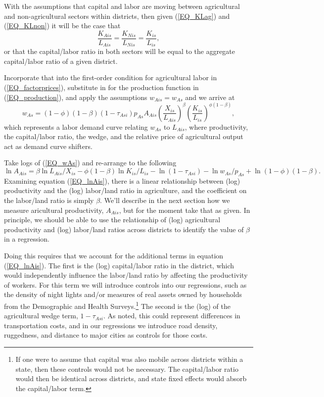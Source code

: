 \documentclass[11pt]{article}
\begin{document}
With the assumptions that capital and labor are moving between agricultural and non-agricultural sectors within districts, then given (\ref{EQ_KLag}) and (\ref{EQ_KLnon}) it will be the case that
\begin{equation*}
	\frac{K_{Ais}}{L_{Ais}} = \frac{K_{Nis}}{L_{Nis}} = \frac{K_{is}}{L_{is}},
\end{equation*}
or that the capital/labor ratio in both sectors will be equal to the aggregate capital/labor ratio of a given district.

Incorporate that into the first-order condition for agricultural labor in (\ref{EQ_factorprices}), substitute in for the production function in (\ref{EQ_production}), and apply the assumptions $w_{Ais} = w_{As}$ and we arrive at
\begin{equation}
	w_{As} = (1-\phi)(1-\beta) (1-\tau_{Asi}) p_{As} A_{Ais} \left(\frac{X_{is}}{L_{Ais}}\right)^{\beta} \left(\frac{K_{is}}{L_{is}}\right)^{\phi(1-\beta)}, \label{EQ_wAs}
\end{equation}
which represents a labor demand curve relating $w_{As}$ to $L_{Ais}$, where productivity, the capital/labor ratio, the wedge, and the relative price of agricultural output act as demand curve shifters. 

Take logs of (\ref{EQ_wAs}) and re-arrange to the following
\begin{equation}
	\ln A_{Ais} = \beta \ln L_{Ais}/X_{is} - \phi(1-\beta) \ln K_{is}/L_{is} - \ln (1-\tau_{Asi}) - \ln w_{As}/p_{As} + \ln (1-\phi)(1-\beta). \label{EQ_lnAis}
\end{equation}
Examining equation (\ref{EQ_lnAis}), there is a linear relationship between (log) productivity and the (log) labor/land ratio in agriculture, and the coefficient on the labor/land ratio is simply $\beta$. We'll describe in the next section how we measure aricultural productivity, $A_{Ais}$, but for the moment take that as given. In principle, we should be able to use the relationship of (log) agricultural productivity and (log) labor/land ratios across districts to identify the value of $\beta$ in a regression.

Doing this requires that we account for the additional terms in equation (\ref{EQ_lnAis}). The first is the (log) capital/labor ratio in the district, which would independently influence the labor/land ratio by affecting the productivity of workers. For this term we will introduce controls into our regressions, such as the density of night lights and/or measures of real assets owned by households from the Demographic and Health Surveys.\footnote{If one were to assume that capital was also mobile across districts within a state, then these controls would not be necessary. The capital/labor ratio would then be identical across districts, and state fixed effects would absorb the capital/labor term.} The second is the (log) of the agricultural wedge term, $1-\tau_{Asi}$. As noted, this could represent differences in transportation costs, and in our regressions we introduce road density, ruggedness, and distance to major cities as controls for those costs.
\end{document}
